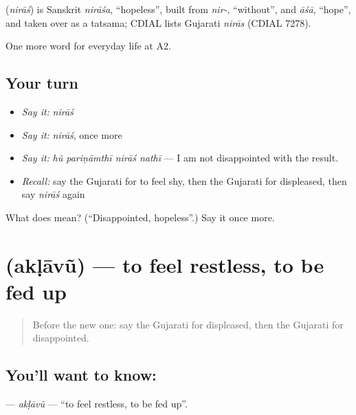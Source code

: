 \begin{cousinweb}
\textbf{} (\emph{nirāś}) is Sanskrit \emph{nirāśa}, \textquotedblleft{}hopeless\textquotedblright{}, built from \emph{nir-}, \textquotedblleft{}without\textquotedblright{}, and \emph{āśā}, \textquotedblleft{}hope\textquotedblright{}, and taken over as a tatsama; CDIAL lists Gujarati \emph{nirās} (CDIAL 7278).
\end{cousinweb}

\begin{grammarlens}[title={What you've built}]
One more word for everyday life at A2.
\end{grammarlens}

\subsection*{Your turn}
\begin{itemize}
\raggedright
  \item \emph{Say it:} \emph{nirāś}
  \item \emph{Say it:} \emph{nirāś}, once more
  \item \emph{Say it:} \emph{hũ pariṇāmthī nirāś nathī} — I am not disappointed with the result.
  \item \emph{Recall:} say the Gujarati for to feel shy, then the Gujarati for displeased, then say \emph{nirāś} again
\end{itemize}

\begin{tcolorbox}[breakable,colback=teal!4,colframe=teal!35!black,title={Before you move on}]
What does  mean? (\textquotedblleft{}Disappointed, hopeless\textquotedblright{}.) Say it once more.
\end{tcolorbox}
\section[\texorpdfstring{\gu{અકળાવું} (akḷāvũ)}{અકળાવું (akḷāvũ)}]{ (akḷāvũ) — to feel restless, to be fed up}

\label{lesson:GU-C267-akalavu}



\begin{quote}
Before the new one: say the Gujarati for displeased, then the Gujarati for disappointed.
\end{quote}

\subsection*{You'll want to know: }
\textbf{} — \emph{akḷāvũ} — \textquotedblleft{}to feel restless, to be fed up\textquotedblright{}.


